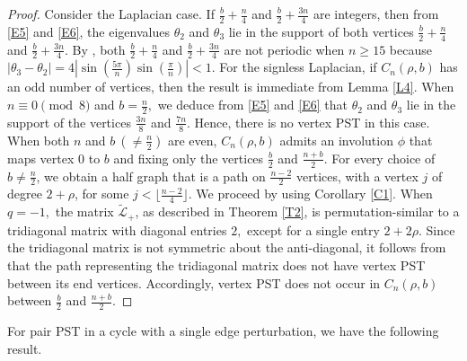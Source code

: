 \documentclass[12pt,a4paper]{article}
\newcommand{\ob}[1]{\left(#1\right)}
\begin{document}
\begin{proof}
Consider the Laplacian case. If $\frac{b}{2} + \frac{n}{4}$ and $\frac{b}{2} + \frac{3n}{4}$ are integers, then from \eqref{E5} and \eqref{E6}, the eigenvalues $\theta_2$ and $\theta_3$ lie in the support of both vertices $\frac{b}{2} + \frac{n}{4}$ and $\frac{b}{2} + \frac{3n}{4}$. By \cite[Theorem 4]{kirk4}, both $\frac{b}{2} + \frac{n}{4}$ and $\frac{b}{2} + \frac{3n}{4}$ are not periodic when $n \geq 15$ because $|\theta_3-\theta_2| = 4\left|\sin\ob{\frac{5\pi}{n}} \sin\ob{\frac{\pi}{n}} \right|
    <1$.
For the signless Laplacian, if $C_n (\rho, b)$ has an odd number of vertices, then the result is immediate from Lemma \ref{L4}. When $n\equiv 0\pmod 8$ and $b=\frac{n}{2},$ we deduce from \eqref{E5} and \eqref{E6} that $\theta_2$ and $\theta_3$ lie in the support of the vertices $\frac{3n}{8}$ and $\frac{7n}{8}$. Hence, there is no vertex PST in this case. When both $n$ and $b~(\neq \frac{n}{2})$ are even, $C_n (\rho, b)$ admits an involution $\phi$ that maps vertex $0$ to $b$ and fixing only the vertices $\frac{b}{2}$ and $\frac{n+b}{2}.$ For every choice of $b\neq \frac{n}{2}$, we obtain a half graph that is a path on $\frac{n-2}{2}$ vertices, with a vertex $j$ of degree $2+\rho$, for some $j<\lfloor \frac{n-2}{4}\rfloor$. We proceed by using Corollary \ref{C1}. When $q=-1,$ the matrix $\widetilde{\mathscr{L}}_+$, as described in Theorem \ref{T2}, is permutation-similar to a tridiagonal matrix with diagonal entries $2,$ except for a single entry $2+2\rho.$
Since the tridiagonal matrix is not symmetric about the anti-diagonal, it follows from \cite[Lemma 2]{kay2} that the path representing the tridiagonal matrix does not have vertex PST between its end vertices. Accordingly, vertex PST does not occur in $C_n (\rho, b)$ between $\frac{b}{2}$ and $\frac{n+b}{2}.$ 
\end{proof}
For pair PST in a cycle with a single edge perturbation, we have the following result.
\end{document}
